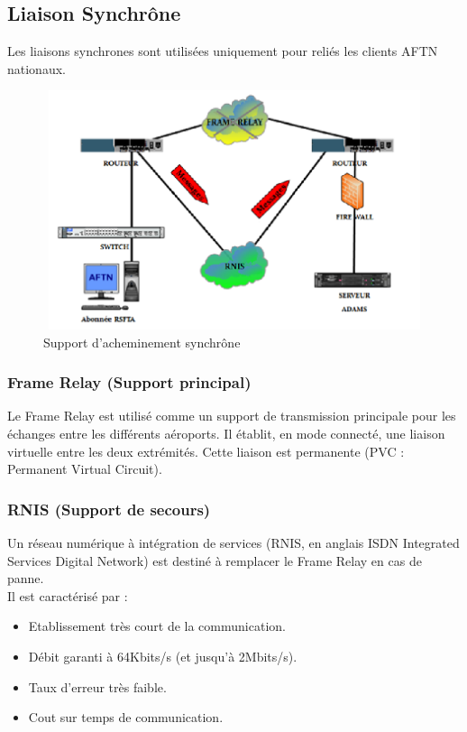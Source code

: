 \subsection{Liaison Synchrône}

Les liaisons synchrones sont utilisées uniquement pour reliés les clients AFTN nationaux.\\
\begin{figure}[!h]
\begin{center}
\includegraphics[width=15cm,height=7cm]{existant/sync.png}
\end{center}
\caption{Support d’acheminement synchrône}
\end{figure}
 \subsubsection{Frame Relay (Support principal)}
 
 Le Frame Relay est utilisé comme un support de transmission principale pour les échanges entre les différents aéroports. Il établit, en mode connecté, une liaison virtuelle entre les deux extrémités. Cette liaison est permanente (PVC : Permanent Virtual Circuit).\\
 \subsubsection{RNIS (Support de secours)}
 
 Un réseau numérique à intégration de services (RNIS, en anglais ISDN Integrated Services Digital Network) est destiné à remplacer le Frame Relay en cas de panne.\\
Il est caractérisé par :\\
\begin{itemize}
\item Etablissement très court de la communication.\\
\item Débit garanti à 64Kbits/s (et jusqu'à 2Mbits/s).\\
\item Taux d’erreur très faible.\\
\item Cout sur temps de communication.\\
\end{itemize}
